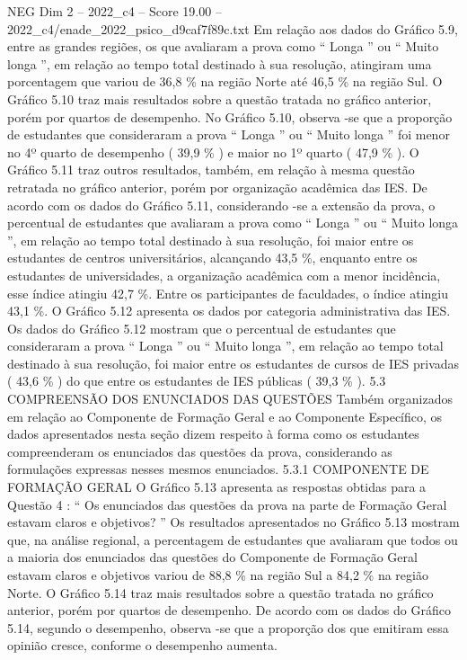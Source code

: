 \begin{textsample}{NEG Dim 2 – 2022\_c4 – Score 19.00 – 2022\_c4/enade\_2022\_psico\_d9caf7f89c.txt}
Em relação aos dados do Gráfico 5.9, entre as grandes regiões, os que avaliaram a prova como “ Longa ” ou “ Muito longa ”, em relação ao tempo total destinado à sua resolução, atingiram uma porcentagem que variou de 36,8 \% na região Norte até 46,5 \% na região Sul.
O Gráfico 5.10 traz mais resultados sobre a questão tratada no gráfico anterior, porém por quartos de desempenho.
No Gráfico 5.10, observa -se que a proporção de estudantes que consideraram a prova “ Longa ” ou “ Muito longa ” foi menor no 4º quarto de desempenho ( 39,9 \% ) e maior no 1º quarto ( 47,9 \% ).
O Gráfico 5.11 traz outros resultados, também, em relação à mesma questão retratada no gráfico anterior, porém por organização acadêmica das IES.
De acordo com os dados do Gráfico 5.11, considerando -se a extensão da prova, o percentual de estudantes que avaliaram a prova como “ Longa ” ou “ Muito longa ”, em relação ao tempo total destinado à sua resolução, foi maior entre os estudantes de centros universitários, alcançando 43,5 \%, enquanto entre os estudantes de universidades, a organização acadêmica com a menor incidência, esse índice atingiu 42,7 \%.
Entre os participantes de faculdades, o índice atingiu 43,1 \%.
O Gráfico 5.12 apresenta os dados por categoria administrativa das IES.
Os dados do Gráfico 5.12 mostram que o percentual de estudantes que consideraram a prova “ Longa ” ou “ Muito longa ”, em relação ao tempo total destinado à sua resolução, foi maior entre os estudantes de cursos de IES privadas ( 43,6 \% ) do que entre os estudantes de IES públicas ( 39,3 \% ). 5.3 COMPREENSÃO DOS ENUNCIADOS DAS QUESTÕES Também organizados em relação ao Componente de Formação Geral e ao Componente Específico, os dados apresentados nesta seção dizem respeito à forma como os estudantes compreenderam os enunciados das questões da prova, considerando as formulações expressas nesses mesmos enunciados. 5.3.1 COMPONENTE DE FORMAÇÃO GERAL O Gráfico 5.13 apresenta as respostas obtidas para a Questão 4 : “ Os enunciados das questões da prova na parte de Formação Geral estavam claros e objetivos? ” Os resultados apresentados no Gráfico 5.13 mostram que, na análise regional, a percentagem de estudantes que avaliaram que todos ou a maioria dos enunciados das questões do Componente de Formação Geral estavam claros e objetivos variou de 88,8 \% na região Sul a 84,2 \% na região Norte.
O Gráfico 5.14 traz mais resultados sobre a questão tratada no gráfico anterior, porém por quartos de desempenho.
De acordo com os dados do Gráfico 5.14, segundo o desempenho, observa -se que a proporção dos que emitiram essa opinião cresce, conforme o desempenho aumenta.

\end{textsample}
